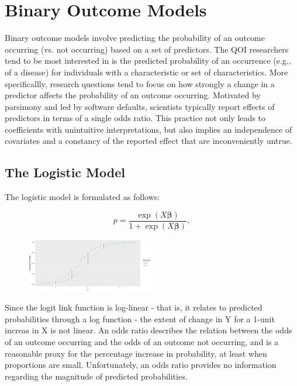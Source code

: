 \documentclass[jou, apacite]{apa6}
\begin{document}
\section{Binary Outcome Models}

Binary outcome models involve predicting the probability of an outcome occurring (vs. not occurring) based on a set of predictors. 
The QOI researchers tend to be most interested in is the predicted probability of an occurrence (e.g., of a disease) for individuals with a characteristic or set of characteristics.
More specificallly, research questions tend to focus on how strongly a change in a predictor affects the probability of an outcome occurring.
Motivated by parsimony and led by software defaults, scientists typically report effects of predictors in terms of a single odds ratio.
This practice not only leads to coefficients with unintuitive interpretations, but also implies an independence of covariates and a constancy of the reported effect that are inconveniently untrue.

\subsection{The Logistic Model}

The logistic model is formulated as follows:

\begin{equation} \label{log1}
p = \dfrac{\exp (X \bm{\beta})}{1 + \exp (X \bm{\beta})},
\end{equation}

\begin{figure}[h]
\includegraphics[width=0.5\textwidth]{LogisticFirstDiff.png}
\end{figure}

Since the logit link function is log-linear - that is, it relates to predicted probabilities through a log function - the extent of change in Y for a 1-unit increas in X is not linear. 
An odds ratio describes the relation between the odds of an outcome occurring and the odds of an outcome not occurring, and is a reasonable proxy for the percentage increase in probability, at least when proportions are small.
Unfortunately, an odds ratio provides no information regarding the magnitude of predicted probabilities.
\end{document}
